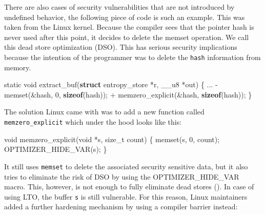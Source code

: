 \documentclass[
  a4paper,
]{report}
\newenvironment{Shaded}{}{}
\newcommand{\DataTypeTok}[1]{\textcolor[rgb]{0.56,0.13,0.00}{#1}}
\newcommand{\DecValTok}[1]{\textcolor[rgb]{0.25,0.63,0.44}{#1}}
\newcommand{\KeywordTok}[1]{\textcolor[rgb]{0.00,0.44,0.13}{\textbf{#1}}}
\newcommand{\NormalTok}[1]{#1}
\newcommand{\OperatorTok}[1]{\textcolor[rgb]{0.40,0.40,0.40}{#1}}
\begin{document}
There are also cases of security vulnerabilities that are not introduced
by undefined behavior, the following piece of code is such an example.
This was taken from the Linux kernel. Because the compiler sees that the
pointer hash is never used after this point, it decides to delete the
memset operation. We call this
\label{__index_entry_180}{dead store optimization
(DSO)}. This has serious security
implications because the intention of the programmer was to delete the
\texttt{hash} information from memory.

\begin{Shaded}
\begin{Highlighting}[]
\DataTypeTok{static} \DataTypeTok{void}\NormalTok{ extract\_buf}\OperatorTok{(}\KeywordTok{struct}\NormalTok{ entropy\_store }\OperatorTok{*}\NormalTok{r}\OperatorTok{,}\NormalTok{ \_\_u8 }\OperatorTok{*}\NormalTok{out}\OperatorTok{)} \OperatorTok{\{}
  \OperatorTok{...}
  \OperatorTok{{-}}\NormalTok{ memset}\OperatorTok{(\&}\NormalTok{hash}\OperatorTok{,} \DecValTok{0}\OperatorTok{,} \KeywordTok{sizeof}\OperatorTok{(}\NormalTok{hash}\OperatorTok{));}
  \OperatorTok{+}\NormalTok{ memzero\_explicit}\OperatorTok{(\&}\NormalTok{hash}\OperatorTok{,} \KeywordTok{sizeof}\OperatorTok{(}\NormalTok{hash}\OperatorTok{));}
\OperatorTok{\}}
\end{Highlighting}
\end{Shaded}

The solution Linux came with was to add a new function called
\texttt{memzero\_explicit} which under the hood looks like this:

\begin{Shaded}
\begin{Highlighting}[]
\DataTypeTok{void}\NormalTok{ memzero\_explicit}\OperatorTok{(}\DataTypeTok{void} \OperatorTok{*}\NormalTok{s}\OperatorTok{,} \DataTypeTok{size\_t}\NormalTok{ count}\OperatorTok{)}
\OperatorTok{\{}
\NormalTok{  memset}\OperatorTok{(}\NormalTok{s}\OperatorTok{,} \DecValTok{0}\OperatorTok{,}\NormalTok{ count}\OperatorTok{);}
\NormalTok{  OPTIMIZER\_HIDE\_VAR}\OperatorTok{(}\NormalTok{s}\OperatorTok{);}
\OperatorTok{\}}
\end{Highlighting}
\end{Shaded}

It still uses
\label{__index_entry_181}{\texttt{memset}}
to delete the associated security sensitive data, but it also tries to
eliminate the risk of DSO by using the OPTIMIZER\_HIDE\_VAR macro. This,
however, is not enough to fully eliminate dead stores
(). In case of using LTO, the
buffer \texttt{s} is still vulnerable. For this reason, Linux
maintainers added a further hardening mechanism by using a compiler
barrier instead:
\end{document}
